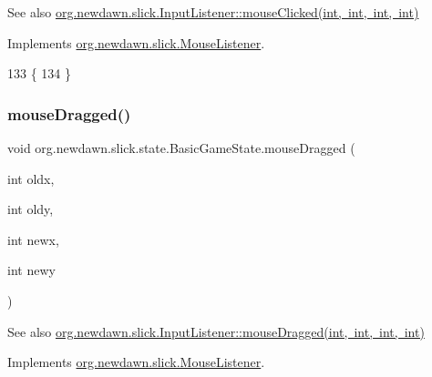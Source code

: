\begin{DoxySeeAlso}{See also}
\mbox{\hyperlink{interfaceorg_1_1newdawn_1_1slick_1_1_mouse_listener_a3e42b74c252ecdc7418b0ee8bcae5510}{org.\+newdawn.\+slick.\+Input\+Listener\+::mouse\+Clicked(int, int, int, int)}} 
\end{DoxySeeAlso}


Implements \mbox{\hyperlink{interfaceorg_1_1newdawn_1_1slick_1_1_mouse_listener_a3e42b74c252ecdc7418b0ee8bcae5510}{org.\+newdawn.\+slick.\+Mouse\+Listener}}.


\begin{DoxyCode}
133                                                                        \{
134     \}
\end{DoxyCode}
\mbox{\label{classorg_1_1newdawn_1_1slick_1_1state_1_1_basic_game_state_a1735e088abcb5a7af3eb5fded03c84a4}} 
\subsubsection{\texorpdfstring{mouse\+Dragged()}{mouseDragged()}}
{\footnotesize\ttfamily void org.\+newdawn.\+slick.\+state.\+Basic\+Game\+State.\+mouse\+Dragged (\begin{DoxyParamCaption}\item[{int}]{oldx,  }\item[{int}]{oldy,  }\item[{int}]{newx,  }\item[{int}]{newy }\end{DoxyParamCaption})\hspace{0.3cm}{\ttfamily [inline]}}

\begin{DoxySeeAlso}{See also}
\mbox{\hyperlink{interfaceorg_1_1newdawn_1_1slick_1_1_mouse_listener_a65022dd6acb492caa47dfd806b207139}{org.\+newdawn.\+slick.\+Input\+Listener\+::mouse\+Dragged(int, int, int, int)}} 
\end{DoxySeeAlso}


Implements \mbox{\hyperlink{interfaceorg_1_1newdawn_1_1slick_1_1_mouse_listener_a65022dd6acb492caa47dfd806b207139}{org.\+newdawn.\+slick.\+Mouse\+Listener}}.


